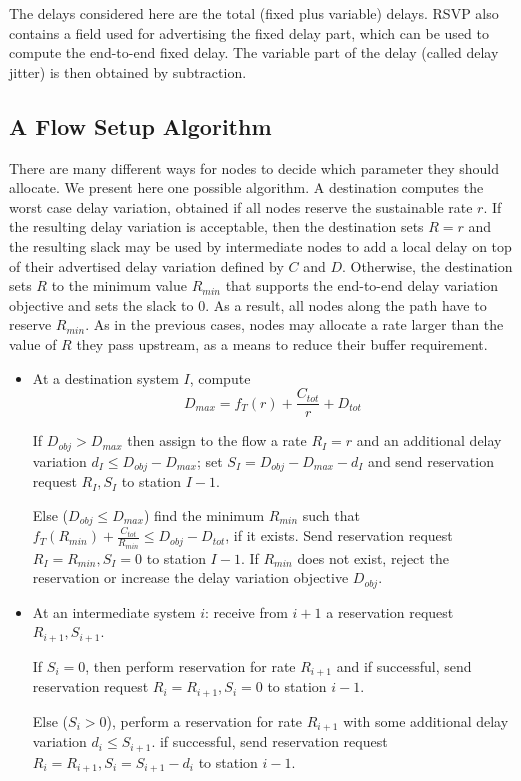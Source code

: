 The delays considered here are the total (fixed plus variable)
delays. RSVP also contains a field used for advertising the fixed
delay part, which can be used to compute the end-to-end fixed
delay. The variable part of the delay (called delay jitter) is
then obtained by subtraction.

\subsection{A Flow Setup Algorithm}

There are many different ways for nodes to decide which parameter
they should allocate. We present here one possible algorithm. A
destination computes the worst case delay variation, obtained if
all nodes reserve the sustainable rate $r$. If the resulting delay
variation is acceptable, then the destination sets $R=r$ and the
resulting slack may be used by intermediate nodes to add a local
delay on top of their advertised delay variation defined by $C$
and $D$. Otherwise, the destination sets $R$ to the minimum value
$R_{min}$ that supports the end-to-end delay variation objective
and sets the slack to $0$. As a result, all nodes along the path
have to reserve $R_{min}$. As in the previous cases, nodes may
allocate a rate larger than the value of $R$ they pass upstream,
as a means to reduce their buffer requirement.

\begin{definition}

\begin{itemize}
    \item At a destination system $I$, compute
    $$
    D_{max}= f_{T}(r) +\frac{C_{tot}}{r}+ D_{tot}
    $$

    If $D_{obj}> D_{max}$ then assign to the flow a rate $R_{I}= r$
    and an additional delay variation $d_{I} \leq D_{obj}-D_{max}$; set
    $S_{I}= D_{obj}-D_{max} -d_{I}$ and
    send reservation request $R_{I}, S_{I}$ to
    station $I-1$.

    Else ($D_{obj}\leq D_{max}$) find the minimum $R_{min}$ such that
    $f_{T}(R_{min}) +\frac{C_{tot}}{R_{min}} \leq D_{obj} - D_{tot}$,
    if it exists.  Send reservation request $R_{I}=R_{min}, S_{I}=0$
    to station $I-1$.  If $R_{min}$ does not exist, reject the
    reservation or increase the delay variation objective $D_{obj}$.

    \item At an intermediate system $i$: receive from $i+1$ a
    reservation request $R_{i+1}, S_{i+1}$.

    If $S_{i}=0$, then perform reservation for rate $R_{i+1}$ and if
    successful, send reservation request $R_{i}=R_{i+1}, S_{i}=0$
    to station $i-1$.

    Else ($S_{i}>0$), perform a reservation for rate $R_{i+1}$ with
    some additional delay variation $d_{i}\leq S_{i+1}$.  if
    successful, send reservation request $R_{i}=R_{i+1},
    S_{i}=S_{i+1}-d_{i}$ to station $i-1$.
\end{itemize}
\end{definition}

